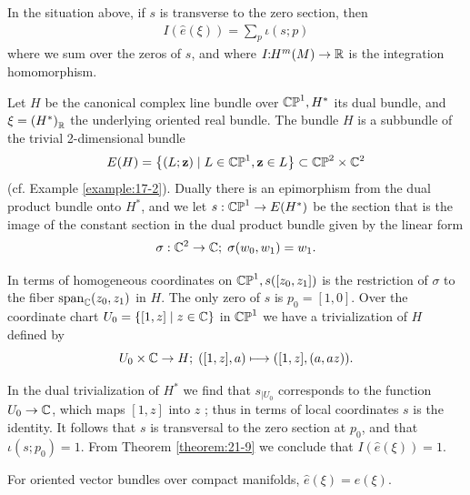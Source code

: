 \begin{theorem}\label{theorem:21-9}
  In the situation above, if $s$ is transverse to the zero section, then
  \begin{align}\label{eq:21-5}
    I({\hat{e}( \xi ) })  = \sum_{p}\iota ( {s;p})
  \end{align}
  where we sum over the zeros of $s$, and where $I\!\!:\!\! H^m( M)  \rightarrow  {\ensuremath{\mathbb{R}}}$ is the integration 
  homomorphism.
\end{theorem}


\begin{example}\label{example:21-10}
  Let $H$ be the canonical complex line bundle over ${\mathbb{CP}}^{1},{H}^*$ its dual bundle, 
  and $\xi  = {( {H}^*) }_{\mathbb{R}}$ the underlying oriented real bundle. The bundle $H$ is a subbundle 
  of the trivial 2-dimensional bundle
  \[
    E( H)  = \left\{  {( {L;\mathbf{z}})  \mid  L \in  {\mathbb{CP}}^{1},\mathbf{z} \in  L}\right\}  
    \subset {\mathbb{CP}}^{2} \times  {{\ensuremath{\mathbb{C}}}}^{2}
  \]
  (cf. Example \ref{example:17-2}). Dually there is an epimorphism from the dual product bundle 
  onto ${H}^*$, and we let $s : {\mathbb{CP}}^{1} \rightarrow E(H^*)$ be the section that is the image 
  of the constant section in the dual product bundle given by the linear form
  \[
    \sigma: {{\mathbb{C}}}^{2} \rightarrow  {\ensuremath{\mathbb{C}}};\;\sigma ( {{w}_{0},{w}_{1}})  = {w}_{1}.
  \]
  
  In terms of homogeneous coordinates on ${\mathbb{CP}}^{1},s( [  {{z}_{0},{z}_{1}}])$ is the restriction of $\sigma$ to 
  the fiber ${\mathrm{span}}_{{\mathbb{C}}}( {{z}_{0},{z}_{1}})$ in $H$. The only zero of $s$ is ${p}_{0} = [  {1,0}]$. Over 
  the coordinate chart ${U}_{0} = \{ [  {1,z}]   \mid  z \in  {\ensuremath{\mathbb{C}}}\}$ in ${\mathbb{CP}}^{1}$ we have a trivialization 
  of $H$ defined by 
  \[
    {U}_{0} \times  {\ensuremath{\mathbb{C}}} \rightarrow  H;\;( {[  {1,z}] ,a})\longmapsto ([1, z], (a, az)).
  \]
  
  In the dual trivialization of ${H}^*$ we find that ${s}_{\mid {U}_{0}}$ corresponds to the 
  function ${U}_{0} \rightarrow  {\ensuremath{\mathbb{C}}}$, which maps $[  {1,z}]$ into $z$ ; thus in terms of local coordinates $s$ 
  is the identity. It follows that $s$ is transversal to the zero section at ${p}_{0}$, and 
  that $\iota ( {s;{p}_{0}}) = 1$. From Theorem \ref{theorem:21-9} we conclude that $I(\hat{e}(\xi)) = 1$.
\end{example}


\begin{theorem}\label{theorem:21-11}
  For oriented vector bundles over compact manifolds, $\hat{e}( \xi )  = e( \xi )$.
\end{theorem}

